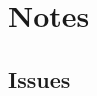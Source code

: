\documentclass[12pt,twoside]{report}
\begin{document}




\chapter{Notes}

\section{Issues}
\end{document}
